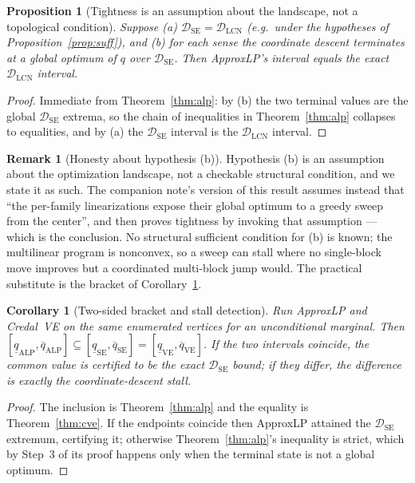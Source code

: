 \documentclass[11pt]{article}
\newtheorem{proposition}{Proposition}
\newtheorem{corollary}{Corollary}
\theoremstyle{definition}
\newtheorem{remark}{Remark}
\newcommand{\lo}{\underline}
\newcommand{\hi}{\overline}
\newcommand{\DSE}{\mathcal{D}_{\mathrm{SE}}}
\newcommand{\DLCN}{\mathcal{D}_{\mathrm{LCN}}}
\begin{document}
\begin{proposition}[Tightness is an assumption about the landscape, not a topological condition]
\label{prop:alptight}
Suppose (a) $\DSE=\DLCN$ (e.g.\ under the hypotheses of Proposition~\ref{prop:suff}), and (b) for
each sense the coordinate descent terminates at a \emph{global} optimum of $q$ over $\DSE$. Then
ApproxLP's interval equals the exact $\DLCN$ interval.
\end{proposition}

\begin{proof}
Immediate from Theorem~\ref{thm:alp}: by (b) the two terminal values are the global $\DSE$ extrema, so
the chain of inequalities in Theorem~\ref{thm:alp} collapses to equalities, and by (a) the $\DSE$
interval is the $\DLCN$ interval.
\end{proof}

\begin{remark}[Honesty about hypothesis (b)]\label{rem:alphonest}
Hypothesis (b) is an assumption about the optimization landscape, not a checkable structural
condition, and we state it as such. The companion note's version of this result assumes instead that
``the per-family linearizations expose their global optimum to a greedy sweep from the center'', and
then proves tightness by invoking that assumption --- which is the conclusion. No structural
sufficient condition for (b) is known; the multilinear program is nonconvex, so a sweep can stall
where no single-block move improves but a coordinated multi-block jump would. The practical
substitute is the bracket of Corollary~\ref{cor:bracket}.
\end{remark}

\begin{corollary}[Two-sided bracket and stall detection]\label{cor:bracket}
Run ApproxLP and Credal~VE on the \emph{same} enumerated vertices for an unconditional marginal. Then
$[\lo q_{\mathrm{ALP}},\hi q_{\mathrm{ALP}}]\subseteq[\lo q_{\mathrm{SE}},\hi q_{\mathrm{SE}}]
=[\lo q_{\mathrm{VE}},\hi q_{\mathrm{VE}}]$. If the two intervals coincide, the common value is
certified to be the exact $\DSE$ bound; if they differ, the difference is exactly the
coordinate-descent stall.
\end{corollary}

\begin{proof}
The inclusion is Theorem~\ref{thm:alp} and the equality is Theorem~\ref{thm:cve}. If the endpoints
coincide then ApproxLP attained the $\DSE$ extremum, certifying it; otherwise
Theorem~\ref{thm:alp}'s inequality is strict, which by Step~3 of its proof happens only when the
terminal state is not a global optimum.
\end{proof}
\end{document}
